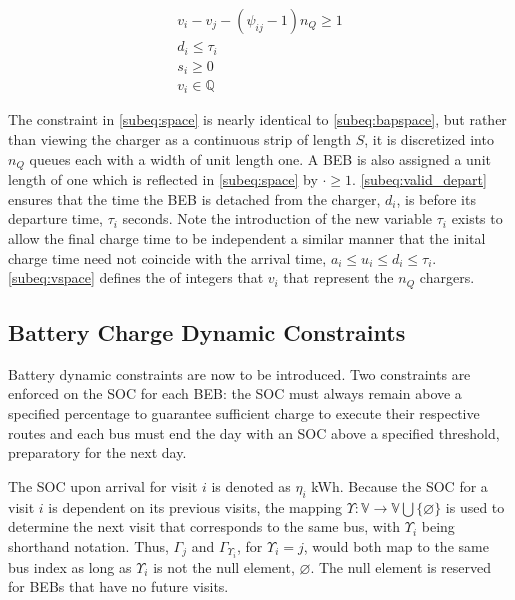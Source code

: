 \documentclass[ee,thesis]{usuthesis}
\begin{document}
\begin{subequations}
\label{eq:packconstrs}
\begin{align}
    v_i - v_j - (\psi_{ij} - 1)n_Q \geq 1 \label{subeq:space} \\ d_i \leq \tau_i \label{subeq:valid_depart} \\ s_i \geq
    0 \label{subeq:pos_charge} \\ v_i \in \mathbb{Q} \label{subeq:vspace}
\end{align}
\end{subequations}

The constraint in \autoref{subeq:space} is nearly identical to \autoref{subeq:bapspace}, but rather than viewing the
charger as a continuous strip of length \(S\), it is discretized into \(n_Q\) queues each with a width of unit length one. A
BEB is also assigned a unit length of one which is reflected in \autoref{subeq:space} by \(\cdot \geq 1\).
\autoref{subeq:valid_depart} ensures that the time the BEB is detached from the charger, \(d_i\), is before its departure
time, \(\tau_i\) seconds. Note the introduction of the new variable \(\tau_i\) exists to allow the final charge time to be
independent a similar manner that the inital charge time need not coincide with the arrival time, \(a_i \le u_i \le d_i \le
\tau_i\). \autoref{subeq:vspace} defines the of integers that \(v_i\) that represent the \(n_Q\) chargers.

\subsection{Battery Charge Dynamic Constraints}
\label{sec:batt_dynamics}
Battery dynamic constraints are now to be introduced. Two constraints are enforced on the SOC for each BEB: the SOC must
always remain above a specified percentage to guarantee sufficient charge to execute their respective routes and each
bus must end the day with an SOC above a specified threshold, preparatory for the next day.

The SOC upon arrival for visit \(i\) is denoted as \(\eta_i\) kWh. Because the SOC for a visit \(i\) is dependent on its previous
visits, the mapping \(\Upsilon: \mathbb{V} \rightarrow \mathbb{V} \bigcup \{\varnothing\}\) is used to determine the next visit that corresponds
to the same bus, with \(\Upsilon_i\) being shorthand notation. Thus, \(\Gamma_j\) and \(\Gamma_{\Upsilon_i}\), for \(\Upsilon_i = j\), would both map to the
same bus index as long as \(\Upsilon_i\) is not the null element, \(\varnothing\). The null element is reserved for BEBs that have
no future visits.
\end{document}
